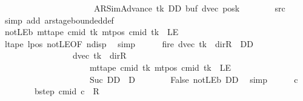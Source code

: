 \begin{isabellebody}
\ \ \ \ \ \ \ \ \ \ \ \ \ \ \ \ \ \ \ \ \ \ {\isacharparenleft}{\kern0pt}AR{\isacharunderscore}{\kern0pt}SimAdvance{\isacharcomma}{\kern0pt}\ tk{\isacharcomma}{\kern0pt}\ DD{\isacharcomma}{\kern0pt}\ buf{\isacharcomma}{\kern0pt}\ dvec{\isacharcomma}{\kern0pt}\ posk{\isacharparenright}{\kern0pt}{\isachardoublequoteclose}\isanewline
\ \ \ \ \ \ \isamarkupfalse%
\ src{}\ \isamarkupfalse%
\ {\isacharparenleft}{\kern0pt}simp\ add{\isacharcolon}{\kern0pt}\ ar{\isacharunderscore}{\kern0pt}stage{\isacharunderscore}{\kern0pt}bounded{\isacharunderscore}{\kern0pt}def{\isacharparenright}{\kern0pt}\isanewline
\ \ \ \ \isamarkupfalse%
\ notLE{\isacharunderscore}{\kern0pt}b{\isacharcolon}{\kern0pt}\ {\isachardoublequoteopen}mt{\isacharunderscore}{\kern0pt}tape\ cmid\ tk\ {\isacharparenleft}{\kern0pt}mt{\isacharunderscore}{\kern0pt}pos\ cmid\ tk{\isacharparenright}{\kern0pt}\ {\isasymnoteq}\ LE{}{\isachardoublequoteclose}\isanewline
\ \ \ \ \ \ \isamarkupfalse%
\ ltape\ lpos\ notLE{\isacharbrackleft}{\kern0pt}OF\ ndisp{\isacharbrackright}{\kern0pt}\ \isamarkupfalse%
\ simp\isanewline
\ \ \ \ \isamarkupfalse%
\ fire{\isacharcolon}{\kern0pt}\ {\isachardoublequoteopen}{\isacharparenleft}{\kern0pt}dvec\ tk\ {\isacharequal}{\kern0pt}\ dir{\isachardot}{\kern0pt}R\ {\isasymand}\ DD\ {\isacharequal}{\kern0pt}\ {}{\isacharparenright}{\kern0pt}\isanewline
\ \ \ \ \ \ \ \ \ \ \ \ \ \ \ \ {\isasymor}\ {\isacharparenleft}{\kern0pt}dvec\ tk\ {\isasymnoteq}\ dir{\isachardot}{\kern0pt}R\isanewline
\ \ \ \ \ \ \ \ \ \ \ \ \ \ \ \ \ \ \ \ {\isasymand}\ mt{\isacharunderscore}{\kern0pt}tape\ cmid\ tk\ {\isacharparenleft}{\kern0pt}mt{\isacharunderscore}{\kern0pt}pos\ cmid\ tk{\isacharparenright}{\kern0pt}\ {\isasymnoteq}\ LE{}\isanewline
\ \ \ \ \ \ \ \ \ \ \ \ \ \ \ \ \ \ \ \ {\isasymand}\ Suc\ DD\ {\isacharequal}{\kern0pt}\ {\isacharquery}{\kern0pt}D{\isacharparenright}{\kern0pt}{\isachardoublequoteclose}\isanewline
\ \ \ \ \ \ \isamarkupfalse%
\ False\ notLE{\isacharunderscore}{\kern0pt}b\ DD\ \isamarkupfalse%
\ simp\isanewline
\ \ \ \ \isamarkupfalse%
\ c{\isacharprime}{\kern0pt}\ \isanewline
\ \ \ \ \ \ \ \ bstep{\isacharcolon}{\kern0pt}\ {\isachardoublequoteopen}{\isacharparenleft}{\kern0pt}cmid{\isacharcomma}{\kern0pt}\ c{\isacharprime}{\kern0pt}{\isacharparenright}{\kern0pt}\ {\isasymin}\ {\isacharquery}{\kern0pt}R{\isachardoublequoteclose}\isanewline

\end{isabellebody}
